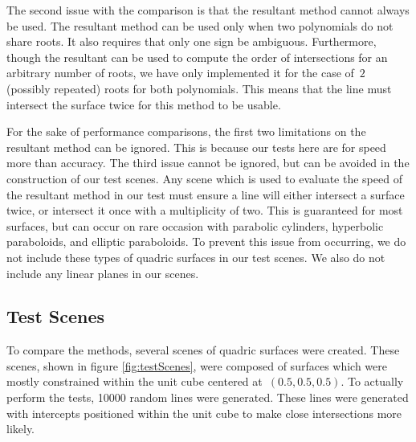 \documentclass{cccg16}
\begin{document}
The second issue with the comparison is that the resultant method
cannot always be used.  The resultant method can be used only when two
polynomials do not share roots.  It also requires that only one sign
be ambiguous.  Furthermore, though the resultant can be used to
compute the order of intersections for an arbitrary number of roots,
we have only implemented it for the case of~$2$ (possibly repeated)
roots for both polynomials.  This means that the line must intersect
the surface twice for this method to be usable.

For the sake of performance comparisons, the first two limitations on
the resultant method can be ignored.  This is because our tests here
are for speed more than accuracy.  The third issue cannot be ignored,
but can be avoided in the construction of our test scenes.  Any scene
which is used to evaluate the speed of the resultant method in our
test must ensure a line will either intersect a surface twice, or
intersect it once with a multiplicity of two.  This is guaranteed for
most surfaces, but can occur on rare occasion with parabolic
cylinders, hyperbolic paraboloids, and elliptic paraboloids.  To
prevent this issue from occurring, we do not include these types of
quadric surfaces in our test scenes.  We also do not include any
linear planes in our scenes.

\subsection{Test Scenes}
To compare the methods, several scenes of quadric surfaces were
created.  These scenes, shown in figure \ref{fig:testScenes}, were
composed of surfaces which were mostly constrained within the unit
cube centered at~$(0.5, 0.5, 0.5)$.  To actually perform the tests,
10000 random lines were generated.  These lines were generated with
intercepts positioned within the unit cube to make close intersections
more likely.
\end{document}
